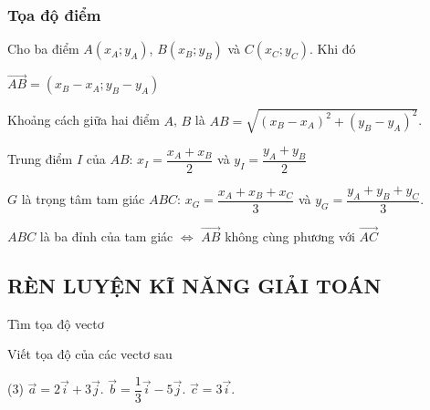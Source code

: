 \subsubsection{Tọa độ điểm}
Cho ba điểm $A\left( x_A;y_A \right)$, $B\left( x_B;y_B\right)$ và $C\left( x_C;y_C\right)$. Khi đó
\begin{tcolorbox}[colframe=cyan,colback=white,boxrule=0.2mm]
	\begin{listEX}[1]
		\item [\ding{172}] $\overrightarrow{AB}=\left( x_B-x_A;y_B-y_A\right)$ 
		\item [\ding{173}] Khoảng cách giữa hai điểm $A$, $B$ là $AB=\sqrt{\left( x_B-x_A\right)^2+\left(y_B-y_A\right)^2}$.
		\item [\ding{174}] Trung điểm $I$ của $AB$:	$x_I=\dfrac{x_A+x_B}{2}$ và $y_I=\dfrac{y_A+y_B}{2}$
		\item [\ding{175}] $G$ là trọng tâm tam giác $ABC$: 
		$x_G=\dfrac{x_A+x_B+x_C}{3}$ và $y_G=\dfrac{y_A+y_B+y_C}{3}$.
		\item [\ding{176}] $ABC$ là ba đỉnh của tam giác $\Leftrightarrow $ $\overrightarrow{AB}$ không cùng phương với $\overrightarrow{AC}$
\end{listEX}
\end{tcolorbox}

\subsection{RÈN LUYỆN KĨ NĂNG GIẢI TOÁN}

\begin{dang}{Tìm tọa độ vectơ}
	
\end{dang}

\begin{vd}
	Viết tọa độ của các vectơ sau
	\begin{tasks}(3)
		\task $\overrightarrow{a}=2\overrightarrow{i}+3\overrightarrow{j}$.
		\task $\overrightarrow{b}=\dfrac{1}{3}\overrightarrow{i}-5\overrightarrow{j}$.
		\task $\overrightarrow{c}=3\overrightarrow{i}$.
	\end{tasks}
\end{vd}

